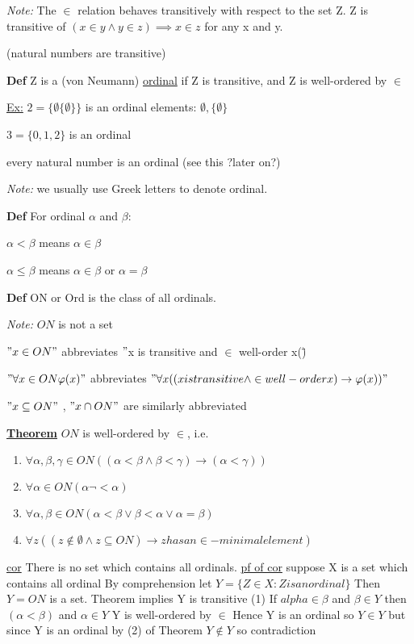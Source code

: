 \documentclass{article}
\begin{document}
    \emph{Note:} The $\in $ relation behaves transitively with respect to the set Z.
    Z is transitive of $(x \in y \wedge y \in z) \implies x \in z$ for any x and y.

    (natural numbers are transitive)
    
    \textbf{Def} Z is a (von Neumann) \underline{ordinal} if Z is transitive, and Z is well-ordered by $\in$
    
    \underline{Ex:} $2 = \{\emptyset\{\emptyset\}\}$ is an ordinal
    elements: $\emptyset, \{\emptyset\}$
    
    $3=\{0,1,2\}$ is an ordinal
    
    every natural number is an ordinal (see this ?later on?)
    
    \emph{Note: } we usually use Greek letters to denote ordinal.
    
    \textbf{Def} For ordinal $\alpha$ and $\beta$:
    
    $\alpha < \beta$ means $\alpha \in \beta$
    
    $\alpha \leq \beta$ means $\alpha \in \beta$ or $\alpha = \beta$
    
    \textbf{Def} ON or Ord is the class of all ordinals.
    
    \emph{Note:} $ON$ is not a set
    
    $"x \in ON"$ abbreviates \("\)x is transitive and $\in$ well-order x(\")
    
    $" \forall x \in ON \varphi(x)"$ abbreviates $" \forall x (( x is transitive \wedge \in well-order x) \rightarrow \varphi(x))"$
    
    $"x \subseteq ON"$ , $"x \cap ON"$ are similarly abbreviated
    
    \textbf{\underline{Theorem}} $ON$ is well-ordered by $\in$, i.e. 
    \begin{enumerate}
        \item $\forall \alpha, \beta, \gamma \in ON ((\alpha < \beta \wedge \beta < \gamma) \rightarrow (\alpha < \gamma))$
        \item $\forall \alpha \in ON (\alpha \neg < \alpha)$
        \item $\forall \alpha, \beta \in ON ( \alpha < \beta \vee \beta < \alpha \vee \alpha = \beta)$
        \item $\forall z ((z \notin \emptyset \wedge z \subseteq ON) \rightarrow z has an \in - minimal element)$
        \end{enumerate}

    \underline{cor} There is no set which contains all ordinals.
    \underline{pf of cor} suppose X is a set which contains all ordinal
    By comprehension let $Y=\{Z \in X : Z is an ordinal\}$
    Then $Y=ON$ is a set.
    Theorem implies Y is transitive
    (1) If $alpha \in \beta$ and $\beta \in Y$ then $(\alpha < \beta)$ and $\alpha \in Y$ Y is well-ordered by $\in$
    Hence Y is an ordinal so $Y \in Y$
    but since Y is an ordinal by (2) of Theorem $Y \notin Y$ so contradiction
\end{document}
